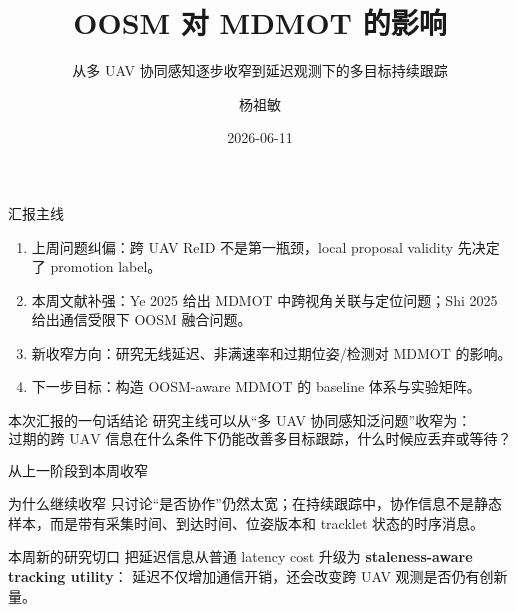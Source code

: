 \documentclass[aspectratio=169,xcolor=dvipsnames]{beamer}
\title{OOSM 对 MDMOT 的影响}
\subtitle{从多 UAV 协同感知逐步收窄到延迟观测下的多目标持续跟踪}
\author{杨祖敏}
\institute
{
    AISO
}
\date{2026-06-11}
\newcommand{\term}[1]{\textbf{#1}}
\begin{document}
\begin{frame}
  \titlepage
\end{frame}


\begin{frame}{汇报主线}
\small
\begin{enumerate}
  \item 上周问题纠偏：跨 UAV ReID 不是第一瓶颈，local proposal validity 先决定了 promotion label。
  \item 本周文献补强：Ye 2025 给出 MDMOT 中跨视角关联与定位问题；Shi 2025 给出通信受限下 OOSM 融合问题。
  \item 新收窄方向：研究无线延迟、非满速率和过期位姿/检测对 MDMOT 的影响。
  \item 下一步目标：构造 OOSM-aware MDMOT 的 baseline 体系与实验矩阵。
\end{enumerate}

\begin{block}{本次汇报的一句话结论}
研究主线可以从“多 UAV 协同感知泛问题”收窄为：
\[
\text{过期的跨 UAV 信息在什么条件下仍能改善多目标跟踪，什么时候应丢弃或等待？}
\]
\end{block}
\end{frame}

\begin{frame}{从上一阶段到本周收窄}
\small
\begin{center}
\end{center}

\begin{alertblock}{为什么继续收窄}
只讨论“是否协作”仍然太宽；在持续跟踪中，协作信息不是静态样本，而是带有采集时间、到达时间、位姿版本和 tracklet 状态的时序消息。
\end{alertblock}

\begin{block}{本周新的研究切口}
把延迟信息从普通 latency cost 升级为 \term{staleness-aware tracking utility}：
延迟不仅增加通信开销，还会改变跨 UAV 观测是否仍有创新量。
\end{block}
\end{frame}
\end{document}
